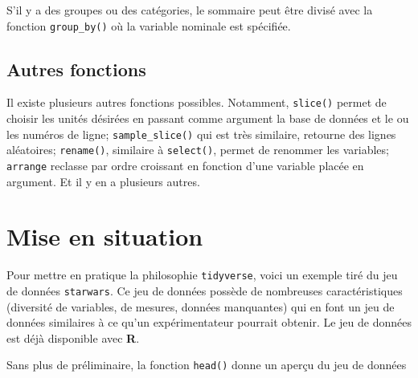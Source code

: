 \documentclass[
]{book}
\begin{document}
S'il y a des groupes ou des catégories, le sommaire peut être divisé avec la fonction \texttt{group\_by()} où la variable nominale est spécifiée.

\hypertarget{autres-fonctions}{%
\subsection{Autres fonctions}\label{autres-fonctions}}

Il existe plusieurs autres fonctions possibles. Notamment, \texttt{slice()} permet de choisir les unités désirées en passant comme argument la base de données et le ou les numéros de ligne; \texttt{sample\_slice()} qui est très similaire, retourne des lignes aléatoires; \texttt{rename()}, similaire à \texttt{select()}, permet de renommer les variables; \texttt{arrange} reclasse par ordre croissant en fonction d'une variable placée en argument. Et il y en a plusieurs autres.

\hypertarget{mise-en-situation}{%
\section{Mise en situation}\label{mise-en-situation}}

Pour mettre en pratique la philosophie \texttt{tidyverse}, voici un exemple tiré du jeu de données \texttt{starwars}. Ce jeu de données possède de nombreuses caractéristiques (diversité de variables, de mesures, données manquantes) qui en font un jeu de données similaires à ce qu'un expérimentateur pourrait obtenir. Le jeu de données est déjà disponible avec \textbf{R}.

Sans plus de préliminaire, la fonction \texttt{head()} donne un aperçu du jeu de données
\end{document}

